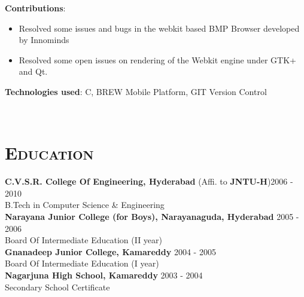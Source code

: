 \begin{resume}
\begin{position}
\textbf{Contributions}:
\begin{itemize}
\item Resolved some issues and bugs in the webkit based BMP Browser
  developed by Innominds
\item Resolved some open issues on rendering of the Webkit engine
  under GTK+ and Qt.
\end{itemize}
\textbf{Technologies used}: C, BREW Mobile Platform, GIT Version
Control  
\end{position}
\\


\section{\textsc{Education}}

\textbf{C.V.S.R. College Of Engineering, Hyderabad} (Affi. to \textbf{JNTU-H})\hfill 2006 - 2010 \\
B.Tech in Computer Science \& Engineering\hfill \\
\newline
\textbf{Narayana Junior College (for Boys), Narayanaguda, Hyderabad} \hfill 2005 - 2006 \\ 
Board Of Intermediate Education (II year) \\
\textbf{Gnanadeep Junior College, Kamareddy} \hfill 2004 - 2005\\
Board Of Intermediate Education (I year) \\
\newline
\textbf{Nagarjuna High School, Kamareddy} \hfill 2003 - 2004 \\
Secondary School Certificate
\\




\end{resume}
